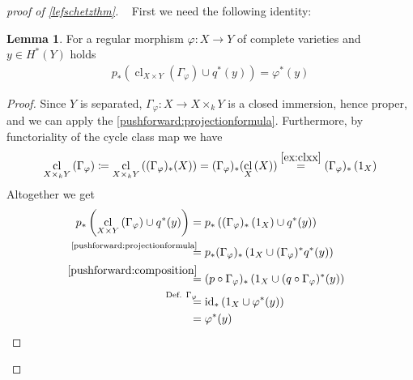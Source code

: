 \documentclass[english]{scrartcl}
\theoremstyle{definition}
\newtheorem{Lem}[Def]{Lemma}
\theoremstyle{remark}
\newcommand*{\id}{\text{id}} %
\newcommand*{\Graph}[1]{{\Gamma_{#1}}} %
\DeclareMathOperator{\CL}{cl} %
\newcommand*{\cl}[2]{{\CL_{#1}\left(#2\right)}} %
\newcommand*{\one}[1]{{1_{#1}}}%
\renewcommand*{\phi}{\varphi}
\begin{document}
\begin{proof}[proof of \autoref{lefschetzthm}]~
    First we need the following identity:
    \begin{Lem}\label{step1}
      For a regular morphism $\phi\colon X\to Y$ of complete varieties
      and $y\in H^*(Y)$ holds
      \begin{gather*}
        p_*\left(\cl{X\times Y}{\Graph{\phi}} \cup q^*(y)\right)
        = \phi^*(y)           
      \end{gather*}
      \begin{proof}
        Since $Y$ is separated, $\Graph{\phi}\colon X\to X\times_k Y$
        is a closed immersion, hence proper, and we can apply the
        \ref{pushforward:projectionformula}.
        Furthermore, by functoriality of the cycle class map we have
        \begin{gather}
          \cl{X\times_k Y}{\Graph{\phi}} \coloneqq
          \cl{X\times_k Y}{(\Graph{\phi})_*(X)} =
          (\Graph{\phi})_*(\cl{X}{X}) \overset{\ref{ex:clxx}}{=} %
          (\Graph{\phi})_*\left(\one{X}\right)
        \end{gather}
        Altogether we get
        \begin{align*}
          p_*\left(\cl{X\times Y}{\Graph{\phi}} \cup q^*(y)\right)
          &=  p_*\left(
            (\Graph{\phi})_*\left(\one{X}\right) \cup q^*(y)
            \right)\\
          &\overset{\mathllap{\text{\ref{pushforward:projectionformula}}}}{=}
            p_*(\Graph{\phi})_*\left( \one{X} \cup (\Graph{\phi})^*q^*(y) \right)\\
          &\overset{\mathllap{\ref{pushforward:composition}}}=
            (p\circ\Graph{\phi})_* \left(
            \one{X} \cup (q\circ\Graph{\phi})^*(y) \right)\\
          &\overset{\mathllap{\text{Def. $\Graph\phi$}}}=
            \id_* \left( \one{X} \cup \phi^*(y) \right)\\
          &= \phi^*(y)
        \end{align*}
      \end{proof}
    \end{Lem}


\end{proof}
\end{document}
